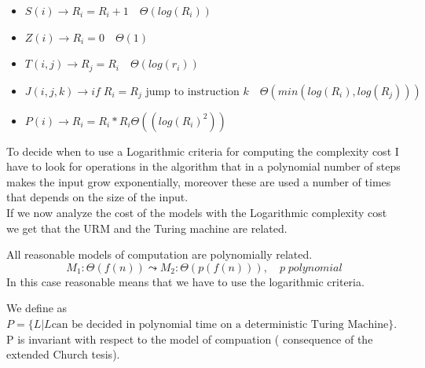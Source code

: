 \begin{itemize}
    \item $S(i) \rightarrow R_i = R_i+1 \quad \Theta(log(R_i))$
    \item $Z(i) \rightarrow R_i = 0 \quad \Theta(1)$
    \item $T(i,j) \rightarrow R_j = R_i \quad \Theta(log(r_i))$
    \item $J(i,j,k) \rightarrow if \;R_i = R_j \text{ jump to instruction } k \quad \Theta(min(log(R_i), log(R_j)))$
    \item $P(i) \rightarrow R_i = R_i*R_i \Theta((log(R_i)^2))$
\end{itemize}
To decide when to use a Logarithmic criteria for computing the complexity cost I have to look for operations in the algorithm that in a polynomial number of steps makes the input grow exponentially, moreover these are used a number of times that depends on the size of the input.\\
If we now analyze the cost of the models with the Logarithmic complexity cost we get that the URM and the Turing machine are related.\\
\begin{thesis}
    All reasonable models of computation are polynomially related.
    \[ 
        M_1: \Theta(f(n)) \leadsto M_2: \Theta (p(f(n))), \quad p \; polynomial 
    \]
    In this case reasonable means that we have to use the logarithmic criteria.
\end{thesis}
We define as $ P = \{L | L \text{can be decided in polynomial time on a deterministic Turing Machine}\} $. P is invariant with respect to the model of compuation ( consequence of the extended Church tesis).
